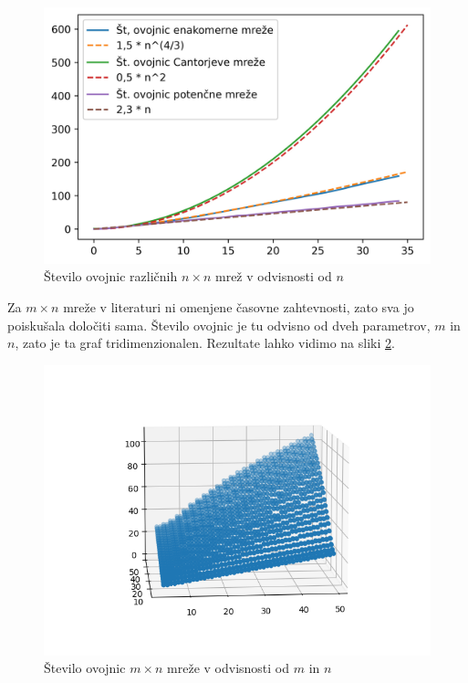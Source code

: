 \documentclass[a4paper]{article}
\begin{document}
\begin{figure}[!h]
	\centering
	\caption{Število ovojnic različnih $n \times n$ mrež v odvisnosti od $n$}
	\label{fig:st_ovojnic}
	\includegraphics[scale=0.6]{slike/st_ovojnic.jpg}
\end{figure}

Za $m \times n$ mreže v literaturi ni omenjene časovne zahtevnosti, zato sva jo poiskušala določiti sama. Število ovojnic je tu odvisno od dveh parametrov, $m$ in $n$, zato je ta graf 
tridimenzionalen. Rezultate lahko vidimo na sliki \ref{fig:3d}.

\begin{figure}[!h]
	\centering
	\caption{Število ovojnic $m \times n$ mreže v odvisnosti od $m$ in $n$}
	\label{fig:3d}
	\includegraphics[scale=0.6]{slike/mxn_3d.png}
\end{figure}
\end{document}
